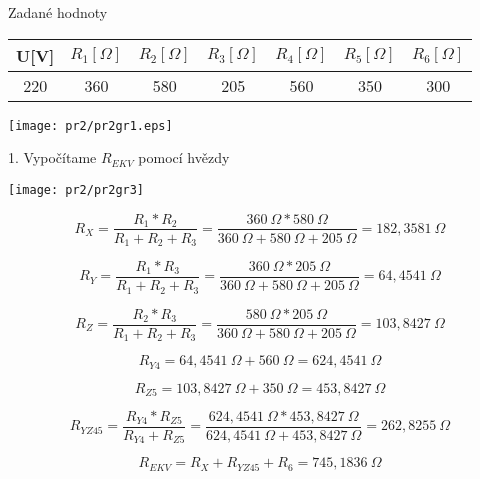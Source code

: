 \documentclass[a4paper,12pt]{article}
\begin{document}
Zadané hodnoty

\begin{tabular} {|  c | c |  c | c | c | c | c |}
\hline
U[V] & $R_1[\Omega]$ & $R_2[\Omega]$ & $R_3[\Omega]$ & $R_4[\Omega]$ & $R_5[\Omega]$ & $R_6[\Omega]$\\ \hline
220 & 360 & 580 & 205 & 560 & 350 & 300 \\ \hline
\end{tabular}
\bigskip

\begin{center}
\texttt{[image: pr2/pr2gr1.eps]}
\end{center}

1. Vypočítame $R_{EKV}$ pomocí hvězdy

\begin{center}
\texttt{[image: pr2/pr2gr3]}
\end{center}

\begin{equation*}
R_X = \frac{R_1*R_2}{R_1+R_2+R_3} = \frac{360\ \Omega*580\ \Omega}{360\ \Omega + 580\ \Omega + 205\ \Omega} = 182,3581\ \Omega
\end{equation*}

\begin{equation*}
R_Y = \frac{R_1*R_3}{R_1+R_2+R_3} = \frac{360\ \Omega*205\ \Omega}{360\ \Omega + 580\ \Omega + 205\ \Omega} = 64,4541\ \Omega
\end{equation*}

\begin{equation*}
R_Z = \frac{R_2*R_3}{R_1+R_2+R_3} = \frac{580\ \Omega*205\ \Omega}{360\ \Omega + 580\ \Omega + 205\ \Omega} = 103,8427\ \Omega
\end{equation*}

\begin{equation*}
R_{Y4} = 64,4541\ \Omega + 560\ \Omega = 624,4541\ \Omega 
\end{equation*}

\begin{equation*}
R_{Z5} = 103,8427\ \Omega + 350\ \Omega = 453,8427\ \Omega 
\end{equation*}

\begin{equation*}
R_{YZ45} = \frac{R_{Y4}*R_{Z5}}{R_{Y4}+R_{Z5}} = \frac{624,4541\ \Omega* 453,8427\ \Omega}{624,4541\ \Omega + 453,8427\ \Omega} = 262,8255\ \Omega
\end{equation*}

\begin{equation*}
R_{EKV} = R_X + R_{YZ45} + R_6 = 745,1836\ \Omega
\end{equation*}
\end{document}
